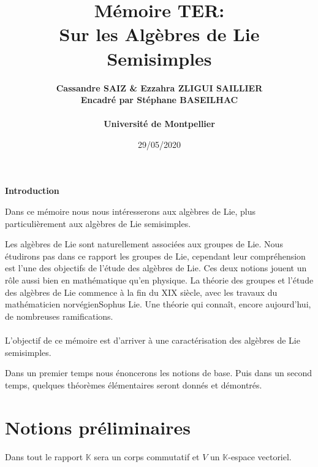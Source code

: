 \documentclass[a4paper,openany,12pt]{report}
\title{\textbf{Mémoire TER: \\ Sur les Algèbres de Lie Semisimples}}
\author{\bf Cassandre SAIZ \& Ezzahra ZLIGUI SAILLIER \\ \bf Encadré par Stéphane BASEILHAC \\ \\Université de Montpellier}
\date{29/05/2020}
\newcommand{\KK}{\mathbb{K}}
\theoremstyle{break}
{\theorembodyfont{\upshape}
\newtheorem*{rmq}{Remarque :}
\newtheorem*{prv}{Preuve :}
\newtheorem*{ex}{Exemples :}
\newtheorem*{exe}{Exemple : }
\newtheorem*{nota}{Notation :}
\newtheorem*{dem}{D\'emonstration :}}
\begin{document}
 

\maketitle
\thispagestyle{fancy}


\begin{center}
\huge{\vspace*{2cm}\textbf{Introduction}}
\end{center}

\quad Dans ce mémoire nous nous intéresserons aux algèbres de Lie, plus particulièrement aux algèbres de Lie semisimples.

Les algèbres de Lie sont naturellement associées aux groupes de Lie. Nous étudirons pas dans ce rapport les groupes de Lie, cependant leur compréhension est l'une des objectifs de l'étude des algèbres de Lie. Ces deux notions jouent un rôle aussi bien en mathématique qu'en physique. La théorie des groupes et l'étude des algèbres de Lie commence à la fin du XIX siècle, avec les travaux du mathématicien norvégien\enskip Sophus Lie.  Une théorie qui connaît, encore aujourd'hui, de nombreuses ramifications.\\
\\
L'objectif de ce mémoire est d'arriver à une caractérisation des algèbres de Lie semisimples. 

Dans un premier temps nous énoncerons les notions de base. Puis dans un second temps, quelques théorèmes élémentaires seront donnés et démontrés.
 

\vspace*{2cm}
    \newpage 

\newpage
\vspace{4mm}
\clearpage
\tableofcontents
\clearpage

\chapter{Notions préliminaires }
Dans tout le rapport $\KK$ sera un corps commutatif et $V$ un $\KK$-espace vectoriel.
\end{document}
